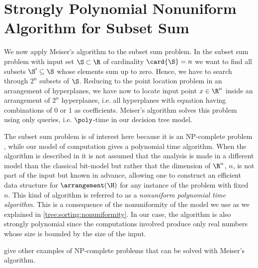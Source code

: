 \section{Strongly Polynomial Nonuniform Algorithm for Subset Sum}

We now apply Meiser's algorithm to the subset sum problem. In the subset sum
problem with input set $\S \subset \R$ of cardinality $\card{\S} = n$ we want to
find all subsets $\S' \subseteq \S$ whose elements sum up to zero. Hence, we have
to search through $2^n$ subsets of $\S$. Reducing to the point location problem
in an arrangement of hyperplanes, we have now to locate input point $x \in
\R^n$ inside an arrangement of $2^n$ hyperplanes, i.e. all hyperplanes with
equation having combinations of $0$ or $1$ as coefficients. Meiser's algorithm
solves this problem using only  queries, i.e. $\poly$-time
in our decision tree model.

The subset sum problem is of interest here because it is an NP-complete problem
\cite{karp:1972}, while our model of computation gives a polynomial time
algorithm. When the algorithm is described in \cite{burgisser:1997} it is not
assumed that the analysis is made in a different model than the classical
bit-model but rather that the dimension of $\R^n$, $n$, is not part of the input
but known in advance, allowing one to construct an efficient data structure for
$\arrangement(\H)$ for any instance of the problem with fixed $n$. This kind of
algorithm is referred to as a \emph{nonuniform polynomial time algorithm}.
This is a consequence of the nonuniformity of the model we use as we explained
in \ref{tree:sorting:nonuniformity}. In our case, the algorithm is
also strongly polynomial since the computations involved produce only real
numbers whose size is bounded by the size of the input.

\citet*{meiser:1993,burgisser:1997} give other examples of
NP-complete problems that can be solved with Meiser's algorithm.
